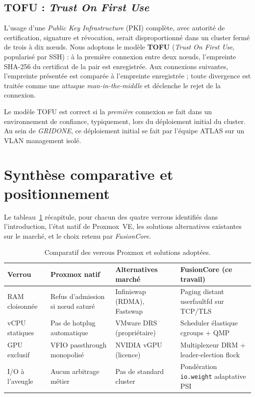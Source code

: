 \subsection{TOFU : \emph{Trust On First Use}}

L'usage d'une \emph{Public Key Infrastructure} (PKI) complète, avec autorité de certification, signature et révocation, serait disproportionné dans un cluster fermé de trois à dix nœuds. Nous adoptons le modèle \textbf{TOFU} (\emph{Trust On First Use}, popularisé par SSH) : à la première connexion entre deux nœuds, l'empreinte SHA-256 du certificat de la pair est enregistrée. Aux connexions suivantes, l'empreinte présentée est comparée à l'empreinte enregistrée ; toute divergence est traitée comme une attaque \emph{man-in-the-middle} et déclenche le rejet de la connexion.

Le modèle TOFU est correct si la \emph{première} connexion se fait dans un environnement de confiance, typiquement, lors du déploiement initial du cluster. Au sein de \emph{GRIDONE}, ce déploiement initial se fait par l'équipe ATLAS sur un VLAN management isolé.

\section{Synthèse comparative et positionnement}
\label{sec:synthese-cmp}

Le tableau~\ref{tab:cmp-proxmox-vs} récapitule, pour chacun des quatre verrous identifiés dans l'introduction, l'état natif de Proxmox~VE, les solutions alternatives existantes sur le marché, et le choix retenu par \emph{FusionCore}.

\begin{table}[H]
\centering
\small
\caption{Comparatif des verrous Proxmox et solutions adoptées.}
\begin{tabular}{p{2.4cm}p{3.6cm}p{3.6cm}p{4.0cm}}
\toprule
\textbf{Verrou} & \textbf{Proxmox natif} & \textbf{Alternatives marché} & \textbf{FusionCore (ce travail)} \\
\midrule
RAM cloisonnée & Refus d'admission si nœud saturé & Infiniswap (RDMA), Fastswap & Paging distant userfaultfd sur TCP/TLS \\
\addlinespace
vCPU statiques & Pas de hotplug automatique & VMware DRS (propriétaire) & Scheduler élastique cgroups + QMP \\
\addlinespace
GPU exclusif & VFIO passthrough monopolisé & NVIDIA vGPU (licence) & Multiplexeur DRM + leader-election flock \\
\addlinespace
I/O à l'aveugle & Aucun arbitrage métier & Pas de standard cluster & Pondération \texttt{io.weight} adaptative PSI \\
\bottomrule
\end{tabular}

\label{tab:cmp-proxmox-vs}
\end{table}



